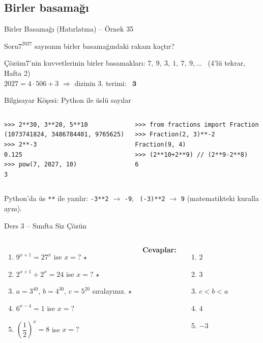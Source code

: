 \documentclass[aspectratio=169,11pt,handout]{beamer}
\newcommand{\soru}[3]{%
\begin{frame}{#1}
  \begin{block}{Soru}\large #2\end{block}
  \pause
  \begin{exampleblock}{Çözüm}\large #3\end{exampleblock}
\end{frame}}
\begin{document}
\subsection{Birler basamağı}
\soru{Birler Basamağı (Hatırlatma) -- Örnek 35}
{\(7^{2027}\) sayısının birler basamağındaki rakam kaçtır?}
{\(7\)'nin kuvvetlerinin birler basamakları: \(7,\ 9,\ 3,\ 1,\ 7,\ 9,\dots\) \ (\(4\)'lü tekrar, Hafta 2)\\[4pt]
\(2027=4\cdot 506+3\) \(\Rightarrow\) dizinin \(3\). terimi: \ \(\mathbf{3}\)}

\begin{frame}[fragile]{Bilgisayar Köşesi: Python ile üslü sayılar}
\begin{columns}[t]
\begin{verbatim}
>>> 2**30, 3**20, 5**10
(1073741824, 3486784401, 9765625)
>>> 2**-3
0.125
>>> pow(7, 2027, 10)
3
\end{verbatim}
\begin{verbatim}
>>> from fractions import Fraction
>>> Fraction(2, 3)**-2
Fraction(9, 4)
>>> (2**10+2**9) // (2**9-2**8)
6
\end{verbatim}
\end{columns}
\small Python'da üs \verb|**| ile yazılır: \verb|-3**2| \(\to\) \verb|-9|, \ \verb|(-3)**2| \(\to\) \verb|9| (matematikteki kuralla aynı).
\end{frame}

\begin{frame}{Ders 3 -- Sınıfta Siz Çözün}
\begin{columns}[t]
\begin{enumerate}
\item \(9^{x+1}=27^{x}\) ise \(x=?\) \(\star\)
\item \(2^{x+1}+2^{x}=24\) ise \(x=?\) \(\star\)
\item \(a=3^{40}\), \(b=4^{30}\), \(c=5^{20}\) sıralayınız. \(\star\)
\item \(6^{x-4}=1\) ise \(x=?\)
\item \(\left(\dfrac12\right)^{x}=8\) ise \(x=?\)
\end{enumerate}
\pause
\textbf{Cevaplar:}
\begin{enumerate}
\item \(2\)
\item \(3\)
\item \(c<b<a\)
\item \(4\)
\item \(-3\)
\end{enumerate}
\end{columns}
\vspace{4pt}{\footnotesize \(\star\) işaretli soruların adım adım çözümü sonraki slaytlardadır.}
\end{frame}
\end{document}
